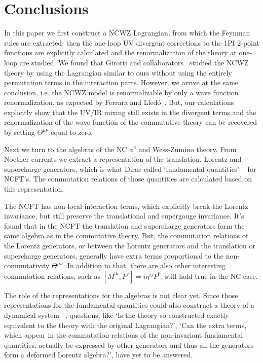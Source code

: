 \documentclass[a4paper,a4paper]{article}
\begin{document}
\section{Conclusions} 
In this paper we first construct a NCWZ Lagrangian, 
from which the Feynman rules are extracted, then the one-loop UV divergent corrections  
to the 1PI 2-point functions are explicitly calculated and the renormalization of the 
theory at one-loop are studied. 
We found that Girotti and collaborators~\cite{GGRS} studied the NCWZ 
theory by using the Lagrangian similar to ours without using the 
entirely permutation terms in the interaction parts. However, we arrive at the same 
conclusion, i.e. the NCWZ model is renormalizable by only 
a wave function renormalization, as expected by Ferrara and Lled\'{o}~\cite{FL}. 
But, our calculations explicitly show that 
the UV/IR mixing still exists in the divergent terms and the renormalization of the wave 
function of the commutative theory can be recovered by setting $\Theta^{\mu\nu}$ equal to zero. 

Next we turn to the algebras of the NC $\phi^4$ and 
Wess-Zumino theory. From Noether currents we extract a representation of 
the translation, Lorentz and supercharge generators, 
which is what Dirac called `fundamental quantities'
~\cite{Dirac} for NCFT's. The commutation relations of those
quantities are calculated based on this representation. 

The NCFT has non-local interaction terms,
which explicitly break the Lorentz invariance, but still preserve the translational and
supergauge invariance. It's found that in the NCFT the translation 
and supercharge generators form the same algebra as in the commutative theory. 
But, the commutation relations of the Lorentz generators, or between 
the Lorentz generators and the translation or supercharge generators, generally 
have extra terms proportional to the non-commutativity $\Theta^{\mu\nu}$. 
In addition to that, there are also other 
interesting commutation relations, such as $[M^{0i},P^j]=i\eta^{ij}P^0$, 
still hold true in the NC case. 

The role of the representations for the algebras is not clear yet. 
Since those representations for the fundamental quantities
could also construct a theory of a dynamical system~\cite{Dirac}
, questions, like `Is the theory so constructed exactly equivalent to the 
theory with the original Lagrangian?', `Can the extra terms, which appear in the 
commutation relations of the non-invariant fundamental quantities, 
actually be expressed by other generators and thus all the generators form 
a deformed Lorentz algebra?', have yet to be answered. 
\end{document}
